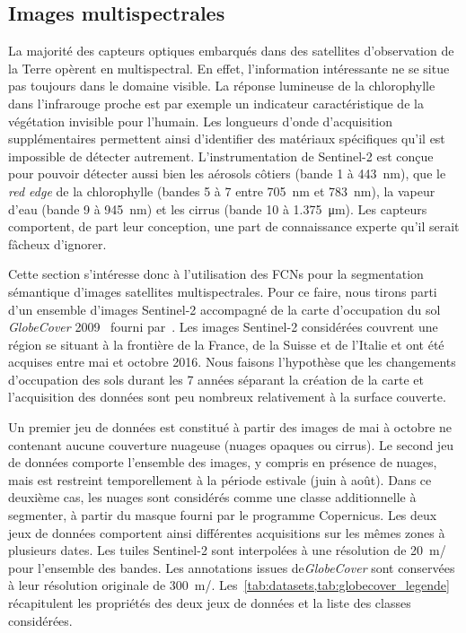 \subsection{Images multispectrales}
\label{sec:multispectral}

La majorité des capteurs optiques embarqués dans des satellites d'observation de la Terre opèrent en multispectral. En effet, l'information intéressante ne se situe pas toujours dans le domaine visible. La réponse lumineuse de la chlorophylle dans l'infrarouge proche est par exemple un indicateur caractéristique de la végétation invisible pour l'humain. Les longueurs d'onde d'acquisition supplémentaires permettent ainsi d'identifier des matériaux spécifiques qu'il est impossible de détecter autrement. L'instrumentation de \gls{Sentinel}-2 est conçue pour pouvoir détecter aussi bien les aérosols côtiers (bande 1 à \SI{443}{\nano\meter}), que le \emph{red edge} de la chlorophylle (bandes 5 à 7 entre \SI{705}{\nano\meter} et \SI{783}{\nano\meter}), la vapeur d'eau (bande 9 à \SI{945}{\nano\meter}) et les cirrus (bande 10 à \SI{1,375}{\micro\meter}). Les capteurs comportent, de part leur conception, une part de connaissance experte qu'il serait fâcheux d'ignorer.

Cette section s'intéresse donc à l'utilisation des \glspl{FCN} pour la segmentation sémantique d'images satellites multispectrales. Pour ce faire, nous tirons parti d'un ensemble d'images Sentinel-2 accompagné de la carte d'occupation du sol \emph{GlobeCover} 2009~\cite{arino_global_2012} fourni par~\citet{ben_hamida_deep_2017}. Les images Sentinel-2 considérées couvrent une région se situant à la frontière de la France, de la Suisse et de l'Italie et ont été acquises entre mai et octobre 2016. Nous faisons l'hypothèse que les changements d'occupation des sols durant les 7 années séparant la création de la carte et l'acquisition des données sont peu nombreux relativement à la surface couverte.

Un premier jeu de données est constitué à partir des images de mai à octobre ne contenant aucune couverture nuageuse (nuages opaques ou cirrus). Le second jeu de données comporte l'ensemble des images, y compris en présence de nuages, mais est restreint temporellement à la période estivale (juin à août). Dans ce deuxième cas, les nuages sont considérés comme une classe additionnelle à segmenter, à partir du masque fourni par le programme Copernicus. Les deux jeux de données comportent ainsi différentes acquisitions sur les mêmes zones à plusieurs dates. Les tuiles Sentinel-2 sont interpolées à une résolution de \SI{20}{\meter/\px} pour l'ensemble des bandes. Les annotations issues de\emph{GlobeCover} sont conservées à leur résolution originale de \SI{300}{\meter/\px}. Les~\cref{tab:datasets,tab:globecover_legende} récapitulent les propriétés des deux jeux de données et la liste des classes considérées.

